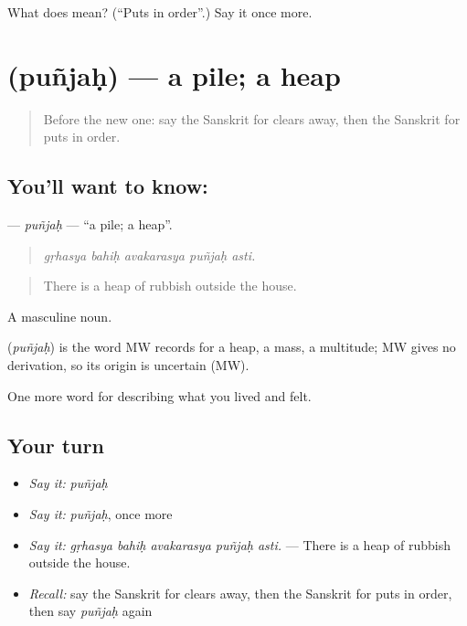 \begin{tcolorbox}[breakable,colback=teal!4,colframe=teal!35!black,title={Before you move on}]
What does  mean? (\textquotedblleft{}Puts in order\textquotedblright{}.) Say it once more.
\end{tcolorbox}
\section[\texorpdfstring{\sk{पुञ्जः} (puñjaḥ)}{पुञ्जः (puñjaḥ)}]{ (puñjaḥ) — a pile; a heap}

\label{lesson:SA-C510-punjah}



\begin{quote}
Before the new one: say the Sanskrit for clears away, then the Sanskrit for puts in order.
\end{quote}

\subsection*{You'll want to know: }
\textbf{} — \emph{puñjaḥ} — \textquotedblleft{}a pile; a heap\textquotedblright{}.

\begin{quote}
    
\end{quote}

\begin{quote}
\emph{gṛhasya bahiḥ avakarasya puñjaḥ asti.}
\end{quote}

\begin{quote}
There is a heap of rubbish outside the house.
\end{quote}

A masculine noun.

\begin{cousinweb}
\textbf{} (\emph{puñjaḥ}) is the word MW records for a heap, a mass, a multitude; MW gives no derivation, so its origin is uncertain (MW).
\end{cousinweb}

\begin{grammarlens}[title={What you've built}]
One more word for describing what you lived and felt.
\end{grammarlens}

\subsection*{Your turn}
\begin{itemize}
\raggedright
  \item \emph{Say it:} \emph{puñjaḥ}
  \item \emph{Say it:} \emph{puñjaḥ}, once more
  \item \emph{Say it:} \emph{gṛhasya bahiḥ avakarasya puñjaḥ asti.} — There is a heap of rubbish outside the house.
  \item \emph{Recall:} say the Sanskrit for clears away, then the Sanskrit for puts in order, then say \emph{puñjaḥ} again
\end{itemize}

